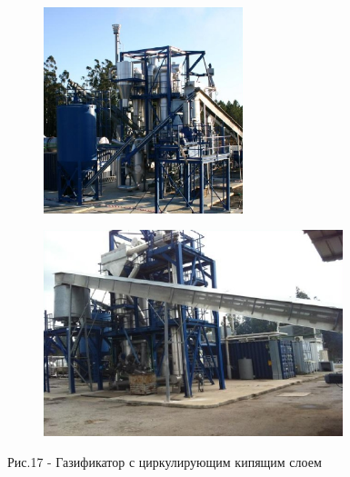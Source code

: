 \begin{figure}[H]
    \centering
    \begin{subfigure}[t]{0.45\textwidth}
        \centering
        \includegraphics[width=\textwidth, height=6cm]{media/chem2/image80}
    \end{subfigure}
    \begin{subfigure}[t]{0.45\textwidth}
        \centering
        \includegraphics[width=\textwidth, height=6cm]{media/chem2/image81}
    \end{subfigure}
    \caption*{Рис.17 - Газификатор с циркулирующим кипящим слоем}
\end{figure}


